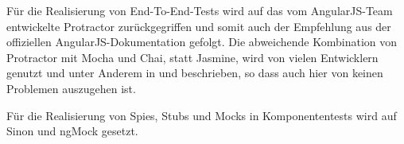 Für die Realisierung von End-To-End-Tests wird auf das vom AngularJS-Team entwickelte Protractor zurückgegriffen und somit auch der Empfehlung aus der offiziellen AngularJS-Dokumentation \cite{angular-e2e} gefolgt. Die abweichende Kombination von Protractor mit Mocha und Chai, statt Jasmine, wird von vielen Entwicklern genutzt und unter Anderem in \cite{protractormocha-1} und \cite{protractormocha-2} beschrieben, so dass auch hier von keinen Problemen auszugehen ist.

Für die Realisierung von Spies, Stubs und Mocks in Komponententests wird auf Sinon und ngMock gesetzt.

